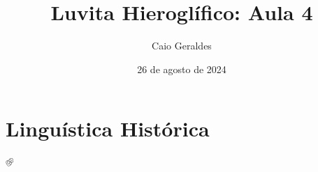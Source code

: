 \documentclass[a4paper,12pt,article]{memoir}
\title{Luvita Hieroglífico: Aula 4}
\author{Caio Geraldes}
\date{26 de agosto de 2024}
\begin{document}
\setlength{\Exlabelsep}{0.5em}
\setlength{\SubExleftmargin}{1.5em}

\frontmatter

\mainmatter%

\maketitle


\chapter{Linguística Histórica}


% 
𔐀

% 


\backmatter%

\printbibliography%
\end{document}
